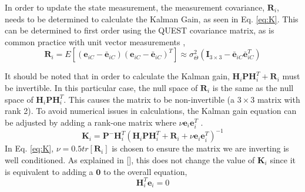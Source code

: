\documentclass[]{aiaa-tc}%
\begin{document}
In order to update the state measurement, the measurement covariance, $\textbf{R}_i$, needs to be determined to calculate the Kalman Gain, as seen in Eq. \ref{eq:K}.  This can be determined to first order using the QUEST covariance matrix, as is common practice with unit vector measurements \cite{Shuster:1981},
%
\begin{equation}\label{eq:meascovR}
\textbf{R}_{i}=E[(\textbf{e}_{iC}-\bar{\textbf{e}}_{iC})(\textbf{e}_{iC}-\bar{\textbf{e}}_{iC})^T]\approx\sigma_\Theta^2(\textbf{I}_{3\times3}-\bar{\textbf{e}}_{iC}\bar{\textbf{e}}_{iC}^T)
\end{equation}
%

It should be noted that in order to calculate the Kalman gain, $\textbf{H}_i\textbf{P}\textbf{H}_i^T+\textbf{R}_i$ must be invertible.  In this particular case, the null space of $\textbf{R}_{i}$ is the same as the null space of $\textbf{H}_i\textbf{P}\textbf{H}_i^T$.  This causes the matrix to be non-invertible (a $3\times3 $ matrix with rank 2).  To avoid numerical issues in calculations, the Kalman gain equation can be adjusted by adding a rank-one matrix where $\nu\textbf{e}_i\textbf{e}_i^T$ \cite{Liounis:2013}.
%
\begin{equation} \label{eq:Knew}
\textbf{K}_i=\textbf{P}^-\textbf{H}_i^T(\textbf{H}_i\textbf{P}\textbf{H}_i^T+\textbf{R}_i+\nu\textbf{e}_i\textbf{e}_i^T)^{-1}
\end{equation}
%
In Eq. \ref{eq:K}, $\nu=0.5tr[\textbf{R}_i]$ is chosen to ensure the matrix we are inverting is well conditioned. As explained in [], this does not change the value of $\textbf{K}_i$ since it is equivalent to adding a $\textbf{0}$ to the overall equation,
%
\begin{equation} \label{eq:Htranse}
\textbf{H}_i^T\textbf{e}_i=0
\end{equation}
%

\end{document}
